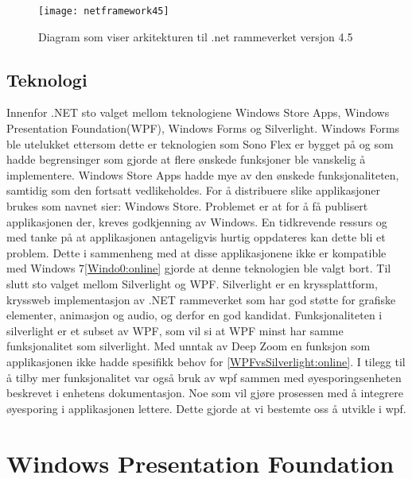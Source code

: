 \begin{figure}[ht]
\centering
\texttt{[image: netframework45]}
\caption{Diagram som viser arkitekturen til .net rammeverket versjon 4.5}
\label{fig:net-arkitektur}
\end{figure}

\subsection{Teknologi}

Innenfor .NET sto valget mellom teknologiene Windows Store Apps, Windows Presentation Foundation(\gls{WPF}), Windows Forms og Silverlight.  Windows Forms ble utelukket ettersom dette er teknologien som Sono Flex er bygget på og som hadde begrensinger som gjorde at flere ønskede funksjoner ble vanskelig å implementere. Windows Store Apps hadde mye av den ønskede funksjonaliteten, samtidig som den fortsatt vedlikeholdes. For å distribuere slike applikasjoner brukes som navnet sier: Windows Store. Problemet er at for å få publisert applikasjonen der, kreves godkjenning av Windows. En tidkrevende ressurs og med tanke på at applikasjonen antageligvis hurtig oppdateres kan dette bli et problem. Dette i sammenheng med at disse applikasjonene ikke er kompatible med Windows 7\ref{Windo0:online} gjorde at denne teknologien ble valgt bort. Til slutt sto valget mellom Silverlight og WPF. Silverlight er en kryssplattform, kryssweb implementasjon av .NET rammeverket som har god støtte for grafiske elementer, animasjon og audio, og derfor en god kandidat. Funksjonaliteten i silverlight er et subset av WPF, som vil si at WPF minst har samme funksjonalitet som silverlight. Med unntak av Deep Zoom en funksjon som applikasjonen ikke hadde spesifikk behov for \ref{WPFvsSilverlight:online}. I tilegg til å tilby mer funksjonalitet var også bruk av wpf sammen med øyesporingsenheten beskrevet i enhetens dokumentasjon. Noe som vil gjøre prosessen med å integrere øyesporing i applikasjonen lettere. Dette gjorde at vi bestemte oss å utvikle i wpf.


\section{Windows Presentation Foundation}

